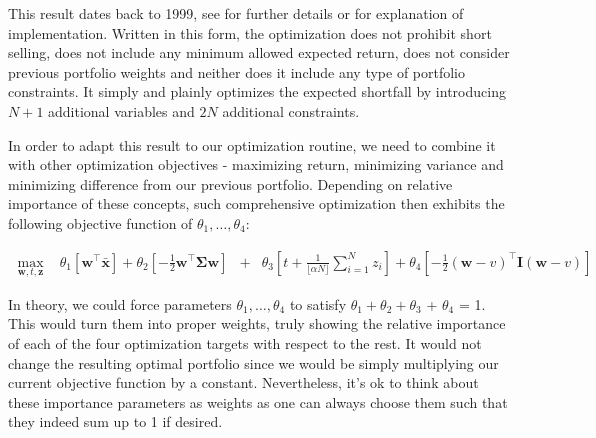 This result dates back to 1999, see \citep{2000Rockafellar} for further details or \citep{DraftGoldberg} for explanation of implementation. Written in this form, the optimization does not prohibit short selling, does not include any minimum allowed expected return, does not consider previous portfolio weights and neither does it include any type of portfolio constraints. It simply and plainly optimizes the expected shortfall by introducing $N+1$ additional variables and $2N$ additional constraints.

In order to adapt this result to our optimization routine, we need to combine it with other optimization objectives - maximizing return, minimizing variance and minimizing difference from our previous portfolio. Depending on relative importance of these concepts, such comprehensive optimization then exhibits the following objective function of $\theta_1, \ldots, \theta_4$:


\begin{eqnarray}
\max_{\mathbf{w},t,\mathbf{z}} \ \ \ \ \theta_1 \left[\mathbf{w}^\top \mathbf{\bar{x}}\right] + \theta_2 \left[-\frac{1}{2} \mathbf{w}^\top\mathbf{\Sigma} \mathbf{w}\right] &+& \theta_3\left[t + \frac{1}{\lfloor{\alpha N}\rfloor} \sum_{i=1}^{N} z_i\right] + \theta_4\left[ -\frac{1}{2} (\mathbf{w}-v)^\top\mathbf{I}(\mathbf{w}-v)\right] \label{eq:portfolio_optimization:objective_function}
\end{eqnarray}

In theory, we could force parameters $\theta_1, \ldots, \theta_4$ to satisfy $\theta_1 + \theta_2 + \theta_3$ + $\theta_4$ = 1. This would turn them into proper weights, truly showing the relative importance of each of the four optimization targets with respect to the rest. It would not change the resulting optimal portfolio since we would be simply multiplying our current objective function by a constant. Nevertheless, it's ok to think about these importance parameters as weights as one can always choose them such that they indeed sum up to 1 if desired.

